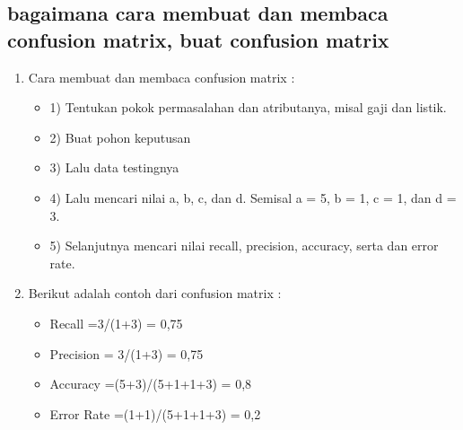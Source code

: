 \subsection{ bagaimana cara membuat dan membaca confusion matrix, buat confusion matrix }
\begin{enumerate}
\item Cara membuat dan membaca confusion matrix :
\begin{itemize}
\item 1)	Tentukan pokok permasalahan dan atributanya, misal gaji dan listik.
\item 2)	Buat pohon keputusan
\item 3)	Lalu data testingnya
\item 4)	Lalu mencari nilai a, b, c, dan d. Semisal a = 5, b = 1, c = 1, dan d = 3.
\item 5)	Selanjutnya mencari nilai recall, precision, accuracy, serta dan error rate.
\end{itemize}
\item Berikut adalah contoh dari confusion matrix :
\begin{itemize}
\item Recall =3/(1+3) = 0,75
\item Precision = 3/(1+3) = 0,75
\item Accuracy =(5+3)/(5+1+1+3) = 0,8
\item Error Rate =(1+1)/(5+1+1+3) = 0,2
\end{itemize}
\end{enumerate}

